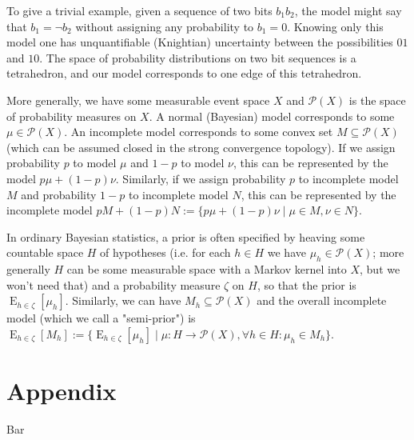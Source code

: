 \documentclass[a4paper]{article}
\DeclareMathOperator{\E}{E}
\newcommand{\Prob}{\mathcal{P}}
\begin{document}
To give a trivial example, given a sequence of two bits $b_1b_2$, the model might say that $b_1=\lnot b_2$ without assigning any probability to $b_1=0$. Knowing only this model one has unquantifiable (Knightian) uncertainty between the possibilities $01$ and $10$. The space of probability distributions on two bit sequences is a tetrahedron, and our model corresponds to one edge of this tetrahedron.

More generally, we have some measurable event space ${X}$ and ${\Prob(X)}$ is the space of probability measures on ${X}$. A normal (Bayesian) model corresponds to some ${\mu \in \Prob(X)}$. An incomplete model corresponds to some convex set ${M \subseteq \Prob(X)}$ (which can be assumed closed in the strong convergence topology). If we assign probability ${p}$ to model ${\mu}$ and ${1-p}$ to model ${\nu}$, this can be represented by the model ${p \mu + (1-p) \nu}$. Similarly, if we assign probability ${p}$ to incomplete model ${M}$ and probability ${1-p}$ to incomplete model ${N}$, this can be represented by the incomplete model ${pM+(1-p)N:=\{p \mu + (1-p) \nu \mid \mu \in M, \nu \in N\}}$.

In ordinary Bayesian statistics, a prior is often specified by heaving some countable space ${H}$ of hypotheses (i.e. for each ${h \in H}$ we have ${\mu_h \in \Prob(X)}$; more generally ${H}$ can be some measurable space with a Markov kernel into ${X}$, but we won't need that) and a probability measure ${\zeta}$ on ${H}$, so that the prior is ${\E_{h \in \zeta}[\mu_h]}$. Similarly, we can have ${M_h \subseteq \Prob(X)}$ and the overall incomplete model (which we call a "semi-prior") is ${\E_{h \in \zeta}[M_h]:=\{\E_{h \in \zeta}[\mu_h] \mid \mu: H \rightarrow \Prob(X), \forall h \in H: \mu_h \in M_h\}}$.


\section{Appendix}

Bar
\end{document}
